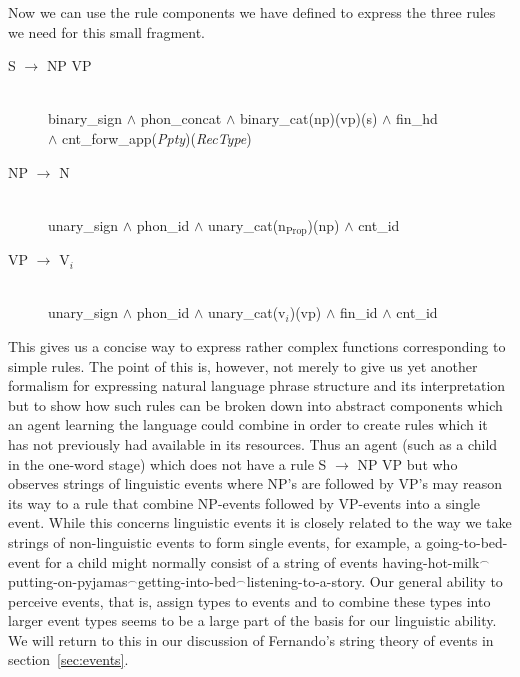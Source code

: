 Now we can use the rule components we have defined to express the
three rules we need for this small fragment.
    

\begin{description}

\item[\textsf{S} $\rightarrow$ \textsf{NP VP}] \mbox{} \\
\textsf{binary\_sign} \d{\d{$\wedge$}} \textsf{phon\_concat} \d{\d{$\wedge$}}
\textsf{binary\_cat}(np)(vp)(s) \d{\d{$\wedge$}} \textsf{fin\_hd}\\
\hspace*{5em}\d{\d{$\wedge$}}
\textsf{cnt\_forw\_app}(\textit{Ppty})(\textit{RecType})

\item[\textsf{NP} $\rightarrow$ \textsf{N}] \mbox{} \\
\textsf{unary\_sign} \d{\d{$\wedge$}} \textsf{phon\_id} \d{\d{$\wedge$}}
\textsf{unary\_cat}(n$_{\mathrm{Prop}}$)(np) \d{\d{$\wedge$}} \textsf{cnt\_id}

\item[\textsf{VP} $\rightarrow$ \textsf{V}$_i$] \mbox{} \\
\textsf{unary\_sign} \d{\d{$\wedge$}} \textsf{phon\_id} \d{\d{$\wedge$}}
\textsf{unary\_cat}(v$_i$)(vp) \d{\d{$\wedge$}} \textsf{fin\_id} \d{\d{$\wedge$}} \textsf{cnt\_id}


\end{description}

This gives us a concise way to express rather complex functions
corresponding to simple rules.  The point of this is, however,  not
merely to
give us yet another formalism for expressing natural language phrase
structure and its interpretation but to show how such rules can be
broken down into abstract components which an agent learning the
language could combine in order to create rules which it has not
previously had available in its resources.  Thus an agent (such as a
child in the one-word stage) which does not have a rule \textsf{S}
$\rightarrow$ \textsf{NP VP} but who observes strings of linguistic
events where NP's are followed by VP's may reason its way to a rule
that combine NP-events followed by VP-events into a single event.
While this concerns linguistic events it is closely related to the way
we take strings of non-linguistic events to form single events, for example, a
going-to-bed-event for a child might normally consist of a string of
events
having-hot-milk$^\frown$putting-on-pyjamas$^\frown$getting-into-bed$^\frown$listening-to-a-story.
Our general ability to perceive events, that is, assign types to events and to combine these
types into larger event types seems to be a large part of the basis
for our linguistic ability.  We will return to this in our discussion
of Fernando's string theory of events in section~\ref{sec:events}.
